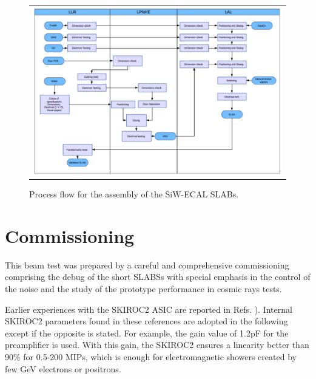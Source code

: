 \documentclass[a4paper,11pt]{article}
\begin{document}
\begin{figure}[!t]
\centering
\begin{tabular}{l}
\includegraphics[width=6.0in]{../figs/assembly.png} 
\end{tabular}
\caption{Process flow for the assembly of the SiW-ECAL SLABs.}
\label{assembly}
\end{figure}

\section{Commissioning}
\label{sec:commissioning}

This beam test was prepared by a careful and comprehensive commissioning comprising
the debug of the
short SLABSs with special emphasis in the control of the noise and the study of the
prototype performance in cosmic rays tests.

Earlier experiences with the SKIROC2 ASIC are reported in Refs. \cite{Amjad:2014tha,Suehara:2018mqk}). 
Internal SKIROC2 parameters found in these references are adopted in the following
except if the opposite is stated.
For example, the gain value of 1.2pF for the preamplifier is used. 
With this gain, the SKIROC2 ensures a linearity better than 90\% 
for 0.5-200 MIPs, which is enough for 
electromagnetic showers created by few GeV 
electrons or positrons.
\end{document}
